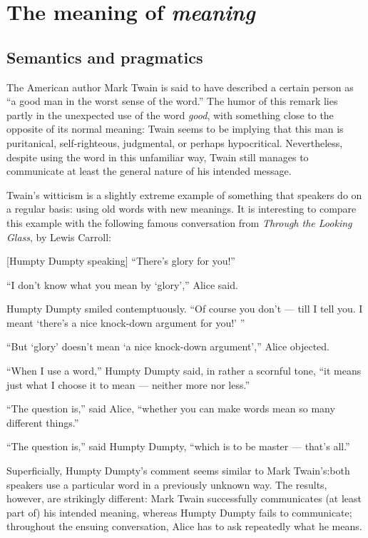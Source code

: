 \chapter{The meaning of \textit{meaning}}\label{sec:1}

\section{Semantics and pragmatics}\label{sec:1.1}

The American author Mark Twain is said to have described a certain person as “a good man in the worst sense of the word.” The humor of this remark lies partly in the unexpected use of the word \textit{good}, with something close to the opposite of its normal meaning: Twain seems to be implying that this man is puritanical, self-righteous, judgmental, or perhaps hypocritical. Nevertheless, despite using the word in this unfamiliar way, Twain still manages to communicate at least the general nature of his intended message.



Twain’s witticism is a slightly extreme example of something that speakers do on a regular basis: using old words with new meanings. It is interesting to compare this example with the following famous conversation from \textit{Through the Looking Glass}, by Lewis Carroll:


\ea
{}[Humpty Dumpty speaking] “There’s glory for you!”

“I don’t know what you mean by ‘glory’,” Alice said.

Humpty Dumpty smiled contemptuously. “Of course you don’t — till I tell you. I meant ‘there’s a nice knock-down argument for you!’ ”

“But ‘glory’ doesn’t mean ‘a nice knock-down argument’,” Alice objected. 

“When I use a word,” Humpty Dumpty said, in rather a scornful tone, “it means just what I choose it to mean — neither more nor less.”

“The question is,” said Alice, “whether you can make words mean so many different things.”

“The question is,” said Humpty Dumpty, “which is to be master — that’s all.”
\z

Superficially, Humpty Dumpty’s comment seems similar to Mark Twain's:\linebreak both speakers use a particular word in a previously unknown way. The results, however, are strikingly different: Mark Twain successfully communicates (at least part of) his intended meaning, whereas Humpty Dumpty fails to communicate; throughout the ensuing conversation, Alice has to ask repeatedly what he means.



